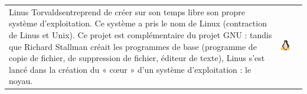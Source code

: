 \documentclass[10pt,fleqn]{article} %
\begin{document}
\begin{center}
\begin{tabular}{m{1cm}m{10cm}m{6cm}}
Linus Torvalds\footnotemark[2] entreprend de créer sur son temps libre son propre système d'exploitation. Ce système a pris le nom de Linux (contraction de Linus et Unix). Ce projet est complémentaire du projet GNU : tandis que Richard Stallman créait les programmes de base (programme de copie de fichier, de suppression de fichier, éditeur de texte), Linus s'est lancé dans la création du « cœur » d'un système d'exploitation : le noyau.
 & 
\begin{center}
\includegraphics[width=3cm]{images/linux.png}
\end{center}
\end{tabular}

\end{center}



%
%
%
\end{document}
